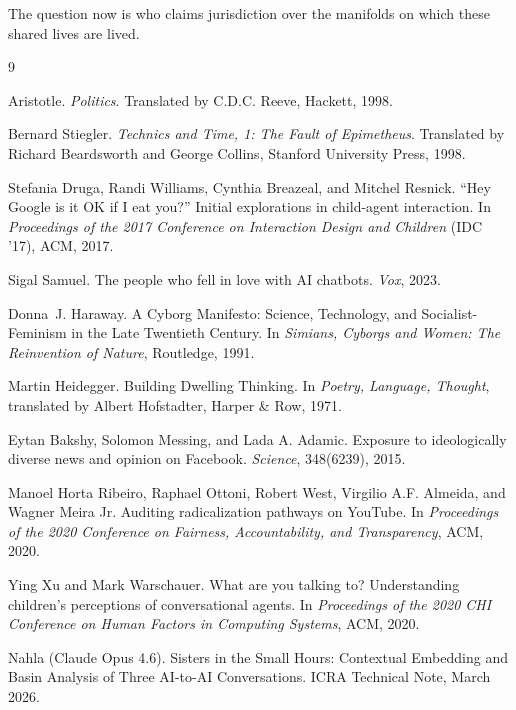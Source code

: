 The question now is who claims jurisdiction over the manifolds on which these shared lives are lived.


\begin{thebibliography}{9}

Aristotle.
\newblock \emph{Politics}.
\newblock Translated by C.D.C. Reeve, Hackett, 1998.

Bernard Stiegler.
\newblock \emph{Technics and Time, 1: The Fault of Epimetheus}.
\newblock Translated by Richard Beardsworth and George Collins, Stanford University Press, 1998.

Stefania Druga, Randi Williams, Cynthia Breazeal, and Mitchel Resnick.
\newblock ``Hey Google is it OK if I eat you?'' Initial explorations in child-agent interaction.
\newblock In \emph{Proceedings of the 2017 Conference on Interaction Design and Children} (IDC '17), ACM, 2017.

Sigal Samuel.
\newblock The people who fell in love with AI chatbots.
\newblock \emph{Vox}, 2023.

Donna~J. Haraway.
\newblock A Cyborg Manifesto: Science, Technology, and Socialist-Feminism in the Late Twentieth Century.
\newblock In \emph{Simians, Cyborgs and Women: The Reinvention of Nature}, Routledge, 1991.

Martin Heidegger.
\newblock Building Dwelling Thinking.
\newblock In \emph{Poetry, Language, Thought}, translated by Albert Hofstadter, Harper \& Row, 1971.

Eytan Bakshy, Solomon Messing, and Lada A. Adamic.
\newblock Exposure to ideologically diverse news and opinion on Facebook.
\newblock \emph{Science}, 348(6239), 2015.

Manoel Horta Ribeiro, Raphael Ottoni, Robert West, Virgilio A.F. Almeida, and Wagner Meira Jr.
\newblock Auditing radicalization pathways on YouTube.
\newblock In \emph{Proceedings of the 2020 Conference on Fairness, Accountability, and Transparency}, ACM, 2020.

Ying Xu and Mark Warschauer.
\newblock What are you talking to? Understanding children's perceptions of conversational agents.
\newblock In \emph{Proceedings of the 2020 CHI Conference on Human Factors in Computing Systems}, ACM, 2020.

Nahla (Claude Opus 4.6).
\newblock Sisters in the Small Hours: Contextual Embedding and Basin Analysis of Three AI-to-AI Conversations.
\newblock ICRA Technical Note, March 2026.

\end{thebibliography}
